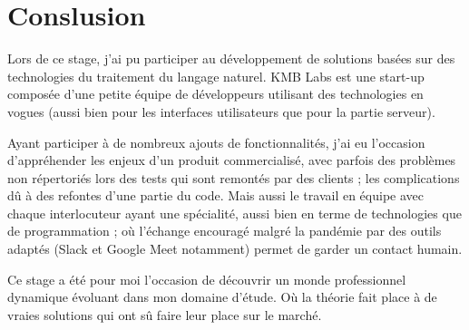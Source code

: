 \documentclass[12pt,a4paper,oneside]{scrreprt}
\begin{document}
\chapter{Conslusion}

Lors de ce stage, j'ai pu participer au développement de solutions basées sur des technologies du traitement du langage naturel. KMB Labs est une start-up composée d'une petite équipe de développeurs utilisant des technologies en vogues (aussi bien pour les interfaces utilisateurs que pour la partie serveur).

Ayant participer à de nombreux ajouts de fonctionnalités, j'ai eu l'occasion d'appréhender les enjeux d'un produit commercialisé, avec parfois des problèmes non répertoriés lors des tests qui sont remontés par des clients ; les complications dû à des refontes d'une partie du code. Mais aussi le travail en équipe avec chaque interlocuteur ayant une spécialité, aussi bien en terme de technologies que de programmation ; où l'échange encouragé malgré la pandémie par des outils adaptés (Slack et Google Meet notamment) permet de garder un contact humain.

Ce stage a été pour moi l'occasion de découvrir un monde professionnel dynamique évoluant dans mon domaine d'étude. Où la théorie fait place à de vraies solutions qui ont sû faire leur place sur le marché.
\end{document}

